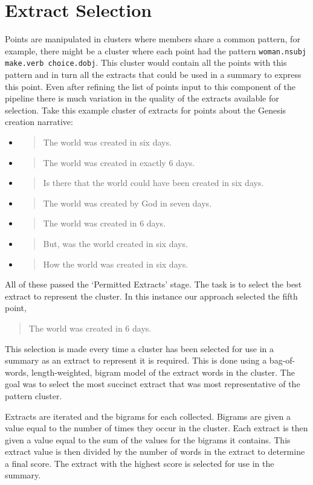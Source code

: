   \section{Extract Selection}
    Points are manipulated in clusters where members share a common pattern, for example, there might be a cluster where each point had the pattern \texttt{woman.nsubj make.verb choice.dobj}. This cluster would contain all the points with this pattern and in turn all the extracts that could be used in a summary to express this point. Even after refining the list of points input to this component of the pipeline there is much variation in the quality of the extracts available for selection. Take this example cluster of extracts for points about the Genesis creation narrative:

    \begin{itemize}[label={}]
      \item{\blockquote{The world was created in six days.}}
      \item{\blockquote{The world was created in exactly 6 days.}}
      \item{\blockquote{Is there that the world could have been created in six days.}}
      \item{\blockquote{The world was created by God in seven days.}}
      \item{\blockquote{The world was created in 6 days.}}
      \item{\blockquote{But, was the world created in six days.}}
      \item{\blockquote{How the world was created in six days.}}
    \end{itemize}

    All of these passed the `Permitted Extracts' stage. The task is to select the best extract to represent the cluster. In this instance our approach selected the fifth point, \blockquote{The world was created in 6 days.}. This selection is made every time a cluster has been selected for use in a summary as an extract to represent it is required. This is done using a bag-of-words, length-weighted, bigram model of the extract words in the cluster. The goal was to select the most succinct extract that was most representative of the pattern cluster.

    Extracts are iterated and the bigrams for each collected. Bigrams are given a value equal to the number of times they occur in the cluster. Each extract is then given a value equal to the sum of the values for the bigrams it contains. This extract value is then divided by the number of words in the extract to determine a final score. The extract with the highest score is selected for use in the summary.

